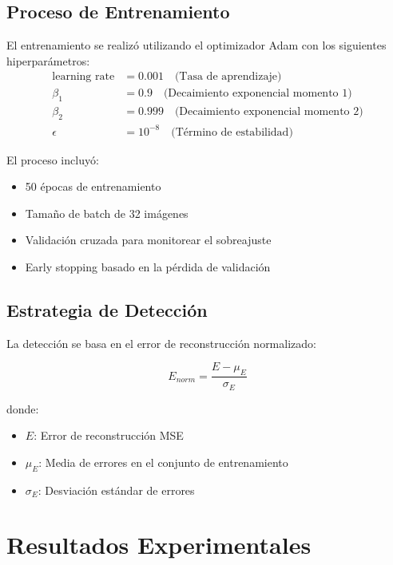\documentclass[conference]{IEEEtran}
\begin{document}
\subsection{Proceso de Entrenamiento}
El entrenamiento se realizó utilizando el optimizador Adam con los siguientes hiperparámetros:
\begin{equation}
\begin{split}
\text{learning rate} &= 0.001 \quad \text{(Tasa de aprendizaje)} \\
\beta_1 &= 0.9 \quad \text{(Decaimiento exponencial momento 1)} \\
\beta_2 &= 0.999 \quad \text{(Decaimiento exponencial momento 2)} \\
\epsilon &= 10^{-8} \quad \text{(Término de estabilidad)}
\end{split}
\end{equation}

El proceso incluyó:
\begin{itemize}
    \item 50 épocas de entrenamiento
    \item Tamaño de batch de 32 imágenes
    \item Validación cruzada para monitorear el sobreajuste
    \item Early stopping basado en la pérdida de validación
\end{itemize}

\subsection{Estrategia de Detección}
La detección se basa en el error de reconstrucción normalizado:

\begin{equation}
E_{norm} = \frac{E - \mu_E}{\sigma_E}
\end{equation}

donde:
\begin{itemize}
    \item \(E\): Error de reconstrucción MSE
    \item \(\mu_E\): Media de errores en el conjunto de entrenamiento
    \item \(\sigma_E\): Desviación estándar de errores
\end{itemize}

\section{Resultados Experimentales}
\end{document}
